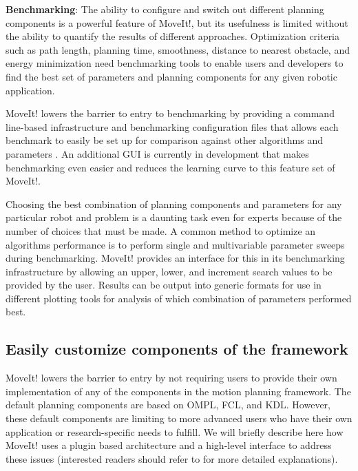 \documentclass[10pt,journal,compsoc]{joser1}
\begin{document}
{{\bf Benchmarking}: The ability to configure and switch out different planning components is a powerful feature of MoveIt!, but its usefulness is limited without the ability to quantify the results of different approaches. Optimization criteria such as path length, planning time, smoothness, distance to nearest obstacle, and energy minimization need benchmarking tools to enable users and developers to find the best set of parameters and planning components for any given robotic application.

MoveIt! lowers the barrier to entry to benchmarking by providing a command line-based infrastructure and benchmarking configuration files that allows each benchmark to easily be set up for comparison against other algorithms and parameters \cite{cohen2012generic}. An additional GUI is currently in development that makes benchmarking even easier and reduces the learning curve to this feature set of MoveIt!.

Choosing the best combination of planning components and parameters for any particular robot and problem is a daunting task even for experts because of the number of choices that must be made\cite{cohen2012generic}. A common method to optimize an algorithms performance is to perform single and multivariable parameter sweeps during benchmarking. MoveIt! provides an interface for this in its benchmarking infrastructure by allowing an upper, lower, and increment search values to be provided by the user. Results can be output into generic formats for use in different plotting tools for analysis of which combination of parameters performed best.

\subsection{Easily customize components of the framework}
\label{subsec:extensiblity}

MoveIt! lowers the barrier to entry by not requiring users to provide their own implementation of any of the components in the motion planning framework. The default planning components are based on OMPL, FCL, and KDL. However, these default components are limiting to more advanced users who have their own application or research-specific needs to fulfill. We will briefly describe here how MoveIt! uses a plugin based architecture and a high-level interface to address these issues (interested readers should refer to \cite{moveit} for more detailed explanations). 

}
\end{document}
